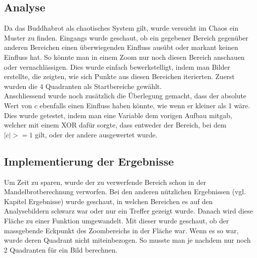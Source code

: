 \subsection{Analyse}
Da das Buddhabrot als chaotisches System gilt, wurde versucht im Chaos ein Muster zu finden. Eingangs wurde geschaut, ob ein gegebener Bereich gegenüber anderen Bereichen einen überwiegenden Einfluss ausübt oder markant keinen Einfluss hat. So könnte man in einem Zoom nur noch diesen Bereich anschauen oder vernachlässigen. Dies wurde einfach bewerkstelligt, indem man Bilder erstellte, die zeigten, wie sich Punkte aus diesen Bereichen iterierten. Zuerst wurden die 4 Quadranten als Startbereiche gewählt.
\\
Anschliessend wurde noch zusätzlich die Überlegung gemacht, dass der absolute Wert von $c$ ebenfalls einen Einfluss haben könnte, wie wenn er kleiner als 1 wäre. Dies wurde getestet, indem man eine Variable dem vorigen Aufbau mitgab, welcher mit einem XOR dafür sorgte, dass entweder der Bereich, bei dem $|c|>=1$ gilt, oder der andere ausgewertet wurde.
\subsection{Implementierung der Ergebnisse}
Um Zeit zu sparen, wurde der zu verwerfende Bereich schon in der Mandelbrotberechnung verworfen. Bei den anderen nützlichen Ergebnissen (vgl. Kapitel Ergebnisse) wurde geschaut, in welchen Bereichen es auf den Analysebildern schwarz war oder nur ein Treffer gezeigt wurde. Danach wird diese Fläche zu einer Funktion umgewandelt. Mit dieser wurde geschaut, ob der massgebende Eckpunkt des Zoombereichs in der Fläche war. Wenn es so war, wurde deren Quadrant nicht miteinbezogen. So musste man je nachdem nur noch 2 Quadranten für ein Bild berechnen.